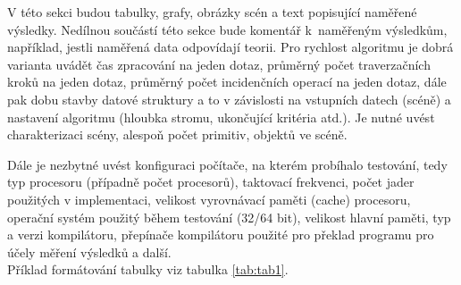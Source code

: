 \documentclass[report,11pt]{elsarticle}
\begin{document}
V této sekci budou tabulky, grafy, obrázky scén a text popisující
naměřené výsledky. Nedílnou součástí této sekce bude komentář
k~naměřeným výsledkům, například, jestli naměřená data odpovídají
teorii. Pro rychlost algoritmu je dobrá varianta uvádět čas zpracování
na jeden dotaz, průměrný počet traverzačních kroků na jeden dotaz,
průměrný počet incidenčních operací na jeden dotaz, dále pak dobu
stavby datové struktury a to v závislosti na vstupních datech (scéně)
a nastavení algoritmu (hloubka stromu, ukončující kritéria atd.). Je
nutné uvést charakterizaci scény, alespoň počet primitiv, objektů ve
scéně.

Dále je nezbytné uvést konfiguraci počítače, na kterém probíhalo
testování, tedy typ procesoru (případně počet procesorů), taktovací
frekvenci, počet jader použitých v implementaci, velikost vyrovnávací
paměti (cache) procesoru, operační systém použitý během testování
(32/64 bit), velikost hlavní paměti, typ a verzi kompilátoru,
přepínače kompilátoru použité pro překlad programu pro účely měření
výsledků a další.\\

Příklad formátování tabulky viz tabulka \ref{tab:tab1}.
\end{document}
